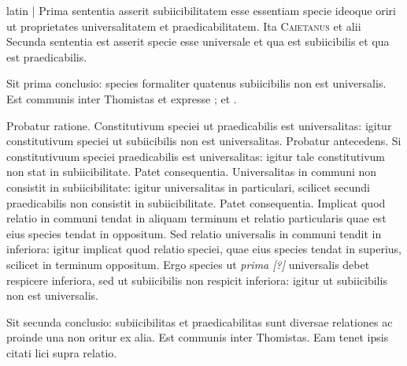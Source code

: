 \begin{otherlanguage*}{latin}
\pstart
 \textnormal{|}   Prima sententia asserit subiicibilitatem esse essentiam specie ideoque oriri ut proprietates universalitatem et praedicabilitatem. Ita \textsc{Caietanus} et alii Secunda sententia est  asserit specie esse universale et qua est subiicibilis et qua est praedicabilis. 
\pend

\pstart
 Sit prima conclusio: species formaliter quatenus subiicibilis non est universalis. Est communis inter Thomistas et expresse ;  et . 
\pend

\pstart
 Probatur ratione. Constitutivum speciei ut praedicabilis est universalitas: igitur constitutivum speciei ut subiicibilis non est universalitas. Probatur antecedens. Si constitutivuum speciei praedicabilis est universalitas: igitur tale constitutivum non stat in subiicibilitate. Patet consequentia. Universalitas in communi non consistit in subiicibilitate: igitur universalitas in particulari, scilicet secundi praedicabilis non consistit in subiicibilitate. Patet consequentia. Implicat quod relatio in communi tendat in aliquam terminum et relatio particularis quae est eius species tendat in oppositum. Sed relatio universalis in communi tendit in inferiora: igitur implicat quod relatio speciei, quae eius species tendat in superius, scilicet in terminum oppositum. Ergo species ut \emph{prima [?]} universalis debet respicere inferiora, sed ut subiicibilis non respicit inferiora: igitur ut subiicibilis non est universalis. 
\pend

\pstart
 Sit secunda conclusio: subiicibilitas et praedicabilitas sunt diversae relationes ac proinde una non oritur ex alia. Est communis inter Thomistas. Eam tenet   ipsis citati lici supra relatio. 
\pend


\end{otherlanguage*}
